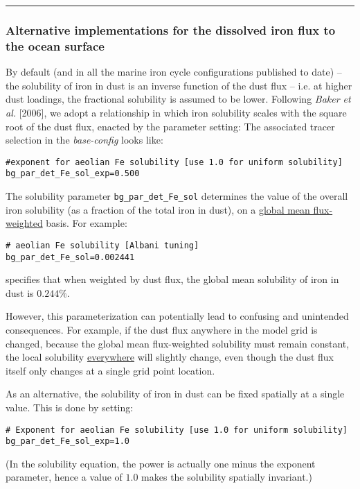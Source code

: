 %
\noindent\rule{4cm}{0.5pt}
\subsubsection{Alternative implementations for the dissolved iron flux to the ocean surface}
\vspace{2mm}

By default (and in all the marine iron cycle configurations published to date) -- the solubility of iron in dust is an inverse function of the dust flux -- i.e. at higher dust loadings, the fractional solubility is assumed to be lower. Following \textit{Baker et al.} [2006], we adopt a relationship in which iron solubility scales with the square root of the dust flux, enacted by the parameter setting:
The associated tracer selection in the \textit{base-config} looks like:
\small\vspace{-2pt}\begin{verbatim}
#exponent for aeolian Fe solubility [use 1.0 for uniform solubility]
bg_par_det_Fe_sol_exp=0.500
\end{verbatim}\vspace{-2pt}\normalsize
The solubility parameter \texttt{\small bg\_par\_det\_Fe\_sol} determines the value of the overall iron solubility (as a fraction of the total iron in dust), on a \uline{global mean flux-weighted} basis. For example:
\small\vspace{-2pt}\begin{verbatim}
# aeolian Fe solubility [Albani tuning]
bg_par_det_Fe_sol=0.002441
\end{verbatim}\vspace{-2pt}\normalsize
specifies that when weighted by dust flux, the global mean solubility of iron in dust is \(0.244\%\).

However, this parameterization can potentially lead to confusing and unintended consequences. For example, if the dust flux anywhere in the model grid is changed, because the global mean flux-weighted solubility must remain constant, the local solubility \uline{everywhere} will slightly change, even though the dust flux itself only changes at a single grid point location.

\vspace{2mm}
As an alternative, the solubility of iron in dust can be fixed spatially at a single value. This is done  by setting:
\small\vspace{-2pt}\begin{verbatim}
# Exponent for aeolian Fe solubility [use 1.0 for uniform solubility]
bg_par_det_Fe_sol_exp=1.0
\end{verbatim}\vspace{-2pt}\normalsize
(In the solubility equation, the power is actually one minus the exponent parameter, hence a value of \(1.0\) makes the solubility spatially invariant.)
 
